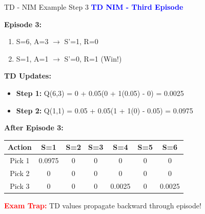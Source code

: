\documentclass[8pt]{beamer}
\begin{document}
	\begin{frame}{TD - NIM Example Step 3}
		\fontsize{6.5}{7.5}\selectfont
		\textcolor{blue}{\textbf{TD NIM - Third Episode}}
		
		\textbf{Episode 3:}
		\begin{enumerate}
			\item S=6, A=3 $\rightarrow$ S'=1, R=0
			\item S=1, A=1 $\rightarrow$ S'=0, R=1 (Win!)
		\end{enumerate}
		
		\textbf{TD Updates:}
		\begin{itemize}
			\item \textbf{Step 1:} Q(6,3) = 0 + 0.05(0 + 1(0.05) - 0) = 0.0025
			\item \textbf{Step 2:} Q(1,1) = 0.05 + 0.05(1 + 1(0) - 0.05) = 0.0975
		\end{itemize}
		
		\textbf{After Episode 3:}
		\begin{tabular}{|c|c|c|c|c|c|c|}
			\hline
			Action & S=1 & S=2 & S=3 & S=4 & S=5 & S=6 \\
			\hline
			Pick 1 & 0.0975 & 0 & 0 & 0 & 0 & 0 \\
			\hline
			Pick 2 & 0 & 0 & 0 & 0 & 0 & 0 \\
			\hline
			Pick 3 & 0 & 0 & 0 & 0.0025 & 0 & 0.0025 \\
			\hline
		\end{tabular}
		
		\textcolor{red}{\textbf{Exam Trap:}} TD values propagate backward through episode!
	\end{frame}
	
\end{document}
